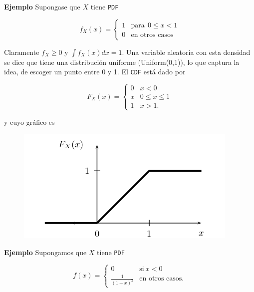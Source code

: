 \documentclass{article}\usepackage[]{graphicx}\usepackage[]{color}
\begin{document}
\vspace{0.3cm}

\textbf{Ejemplo} Supongase que $X$ tiene \texttt{PDF}

\vspace{0.2cm}

\[
f_X(x) = \begin{cases}
1 & \mbox{para} \ \ 0 \leq x < 1 \\
0 & \mbox{en otros casos}
\end{cases}
\]


\vspace{0.2cm}

Claramente $f_{X} \geq 0$ y $\int f_X(x)dx = 1$. Una variable aleatoria con esta densidad se dice que tiene una distribuci\'on uniforme (\mbox{Uniform(0,1)}), lo que captura la idea, de escoger un punto entre 0 y 1.  El \texttt{CDF} est\'a dado por

\vspace{0.2cm}

\[
F_{X}(x) = \begin{cases}
0 & x < 0\\
x & 0 \leq x \leq 1\\
1 & x > 1.
\end{cases}
\]

y cuyo gr\'afico es 

\begin{figure}[h]
\centering
\includegraphics[scale=.55]{graff1-hg.png}
\end{figure}

\vspace{0.2cm}

\textbf{Ejemplo} Supongamos que $X$ tiene \texttt{PDF}

\[
f(x) = \begin{cases}
0 & \mbox{si} \  x < 0\\
\frac{1}{(1 + x)^2} & \mbox{en otros casos}.
\end{cases}
\]
\end{document}
